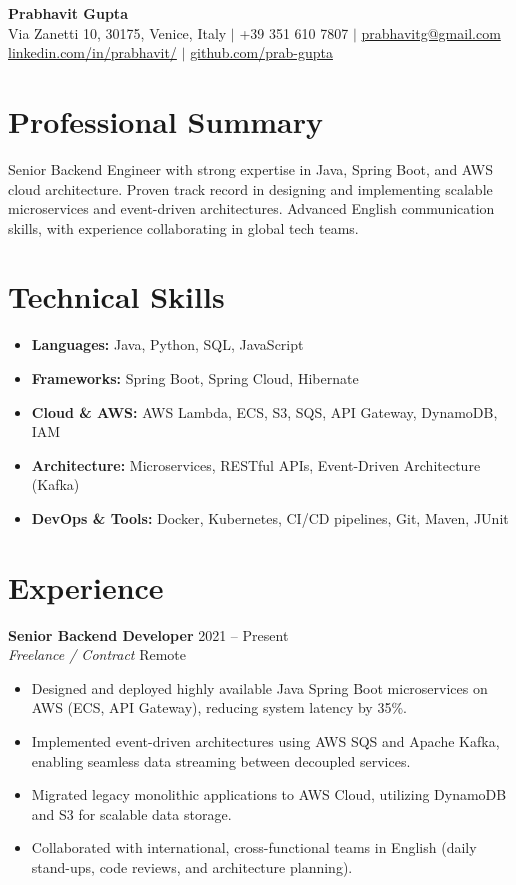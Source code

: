 \documentclass[11pt,a4paper]{article}
\begin{document}
\begin{center}
    {\Huge \textbf{Prabhavit Gupta}} \\
    \vspace{2mm}
    Via Zanetti 10, 30175, Venice, Italy $\vert$ +39 351 610 7807 $\vert$ \href{mailto:prabhavitg@gmail.com}{prabhavitg@gmail.com} \\
    \href{https://www.linkedin.com/in/prabhavit/}{linkedin.com/in/prabhavit/} $\vert$ \href{https://github.com/prab-gupta}{github.com/prab-gupta}
\end{center}

\vspace{5mm}
\section*{Professional Summary}
Senior Backend Engineer with strong expertise in Java, Spring Boot, and AWS cloud architecture. Proven track record in designing and implementing scalable microservices and event-driven architectures. Advanced English communication skills, with experience collaborating in global tech teams.

\section*{Technical Skills}
\begin{itemize}[leftmargin=*]
    \item \textbf{Languages:} Java, Python, SQL, JavaScript
    \item \textbf{Frameworks:} Spring Boot, Spring Cloud, Hibernate
    \item \textbf{Cloud \& AWS:} AWS Lambda, ECS, S3, SQS, API Gateway, DynamoDB, IAM
    \item \textbf{Architecture:} Microservices, RESTful APIs, Event-Driven Architecture (Kafka)
    \item \textbf{DevOps \& Tools:} Docker, Kubernetes, CI/CD pipelines, Git, Maven, JUnit
\end{itemize}

\section*{Experience}
\noindent
\textbf{Senior Backend Developer} \hfill 2021 -- Present \\
\textit{Freelance / Contract} \hfill Remote
\begin{itemize}[leftmargin=*]
    \item Designed and deployed highly available Java Spring Boot microservices on AWS (ECS, API Gateway), reducing system latency by 35\%.
    \item Implemented event-driven architectures using AWS SQS and Apache Kafka, enabling seamless data streaming between decoupled services.
    \item Migrated legacy monolithic applications to AWS Cloud, utilizing DynamoDB and S3 for scalable data storage.
    \item Collaborated with international, cross-functional teams in English (daily stand-ups, code reviews, and architecture planning).
\end{itemize}
\end{document}
